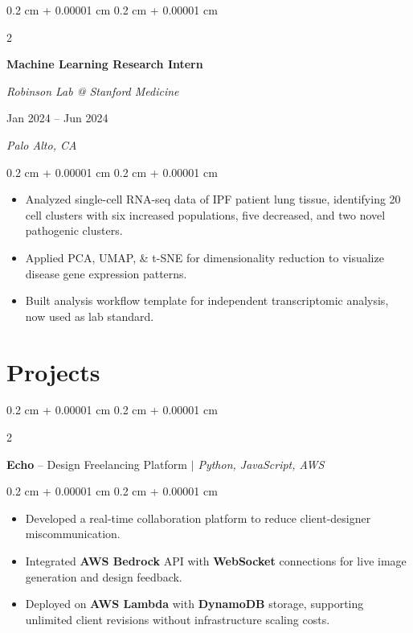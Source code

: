 \documentclass[10pt, letterpaper]{article}
\newenvironment{highlights}{
    \begin{itemize}[
        topsep=0.10 cm,
        parsep=0.10 cm,
        partopsep=0pt,
        itemsep=0pt,
        leftmargin=0.4 cm + 10pt
    ]
}{
    \end{itemize}
} %
\newenvironment{onecolentry}{
    \begin{adjustwidth}{
        0.2 cm + 0.00001 cm
    }{
        0.2 cm + 0.00001 cm
    }
}{
    \end{adjustwidth}
} %
\newenvironment{twocolentry}[2][]{
    \onecolentry
    \def\secondColumn{#2}
    \setcolumnwidth{\fill, 5 cm}
    \begin{paracol}{2}
}{
    \switchcolumn \raggedleft \secondColumn
    \end{paracol}
    \endonecolentry
} %
\let\hrefWithoutArrow\href
\renewcommand{\href}[2]{\hrefWithoutArrow{#1}{\ifthenelse{\equal{#2}{}}{ }{#2 }\raisebox{.15ex}{\footnotesize \faExternalLink*}}}
\begin{document}
        \vspace{0.3 cm}

        \begin{twocolentry}{
        Jan 2024 – Jun 2024    
            
        \textit{Palo Alto, CA}}
            \textbf{Machine Learning Research Intern}
            
            \textit{Robinson Lab @ Stanford Medicine}
        \end{twocolentry}

        \vspace{0.10 cm}
        \begin{onecolentry}
            \begin{highlights}
                \item Analyzed single-cell RNA-seq data of IPF patient lung tissue, identifying 20 cell clusters with six increased populations, five decreased, and two novel pathogenic clusters.
                \item Applied PCA, UMAP, \& t-SNE for dimensionality reduction to visualize disease gene expression patterns.
                \item Built analysis workflow template for independent transcriptomic analysis, now used as lab standard.
            \end{highlights}
        \end{onecolentry}

    
    \section{Projects}
        
        \begin{twocolentry}{}
            \textbf{Echo} -- Design Freelancing Platform \textit{ $|$ Python, JavaScript, AWS}
        \end{twocolentry}

        \vspace{0.10 cm}
        \begin{onecolentry}
            \begin{highlights}
                \item Developed a real-time collaboration platform to reduce client-designer miscommunication.
                \item Integrated \textbf{AWS Bedrock} API with \textbf{WebSocket} connections for live image generation and design feedback.
                \item Deployed on \textbf{AWS Lambda} with \textbf{DynamoDB} storage, supporting unlimited client revisions without infrastructure scaling costs.
            \end{highlights}
        \end{onecolentry}
\end{document}
